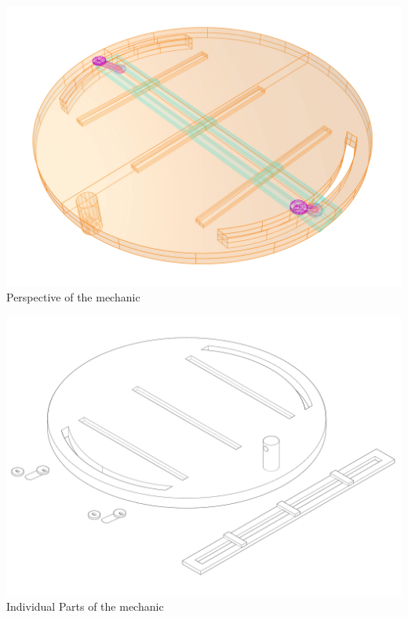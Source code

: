 \documentclass[a4paper,9pt]{article}
\begin{document}
    \vspace{.9cm}
    \begin{minipage}{0.48\linewidth}
        \centering
        \includegraphics[width=.85\linewidth]{Images/ring prototype_v1 - total.pdf}
       \\{Perspective of the mechanic}
         \label{sunpath}
    \end{minipage}
    \hfill
    \begin{minipage}{0.48\linewidth}
         \centering
        \includegraphics[width=.85\linewidth]{Images/ring prototype_v1 - disect.pdf}
       \\{Individual Parts of the mechanic}
        \label{sunpath1}
    \end{minipage}
    \label{sli}
\newpage
\end{document}
